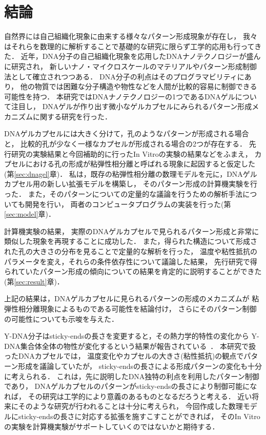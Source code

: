 \chapter{結論}

自然界には自己組織化現象に由来する様々なパターン形成現象が存在し，
我々はそれらを数理的に解析することで基礎的な研究に限らず工学的応用も行ってきた．
近年，DNA分子の自己組織化現象を応用したDNAナノテクノロジーが盛んに研究され，
新しいナノ・マイクロスケールのマテリアルやパターン形成制御法として確立されつつある．
DNA分子の利点はそのプログラマビリティにあり，
他の物質では困難な分子構造や物性などを人間が比較的容易に制御できる可能性を持つ．
本研究ではDNAナノテクノロジーの1つであるDNAゲルについて注目し，
DNAゲルが作り出す微小なゲルカプセルにみられるパターン形成メカニズムに関する研究を行った．

DNAゲルカプセルには大きく分けて，孔のようなパターンが形成される場合と，
比較的孔が少なく一様なカプセルが形成される場合の2つが存在する．
先行研究の実験結果と今回補助的に行ったIn Vitroの実験の結果などをふまえ，
カプセルにおける孔の形成が粘弾性相分離と呼ばれる現象に起因すると仮定した(第\ref{sec:dnagel}章)．
私は，既存の粘弾性相分離の数理モデルを元に，DNAゲルカプセル用の新しい拡張モデルを構築し，
そのパターン形成の計算機実験を行った．
また，そのパターンについての定量的な議論を行うための解析手法についても開発を行い，
両者のコンピュータプログラムの実装を行った(第\ref{sec:model}章)．

計算機実験の結果，
実際のDNAゲルカプセルで見られるパターン形成と非常に類似した現象を再現することに成功した．
また，得られた構造について形成された孔の大きさの分布を見ることで定量的な解析を行った，
温度や粘性抵抗のパラメータを変え，それらの条件依存性について議論した結果，
先行研究で得られていたパターン形成の傾向についての結果を肯定的に説明することができた(第\ref{sec:result}章)．

上記の結果は，DNAゲルカプセルに見られるパターンの形成のメカニズムが
粘弾性相分離現象によるものである可能性を結論付け，
さらにそのパターン制御の可能性についても示唆を与えた．

Y-DNA分子はsticky-endsの長さを変更すると，その熱力学的特性の変化から
Y-DNA集合体全体の物性が変化するという結果が報告されている~\cite{sato2019sequence}．
本研究で扱ったDNAカプセルでは，
温度変化やカプセルの大きさ(粘性抵抗)の観点でパターン形成を議論していたが，
sticky-endsの長さによる形成パターンの変化も十分に考えられる．
これは，先に説明したDNA独特の利点を利用したパターン制御であり，
DNAゲルカプセルのパターンがsticky-endsの長さにより制御可能になれば，
その研究は工学的により意義のあるものとなるだろうと考える．
近い将来にそのような研究が行われることは十分に考えられ，
今回作成した数理モデルにsticky-endsの長さに対応する拡張を施すこすことができれば，
そのIn Vitroの実験を計算機実験がサポートしていくのではないかと期待する．

